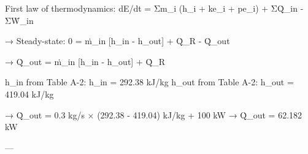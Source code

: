 First law of thermodynamics:  
dE/dt = Σm_i (h_i + ke_i + pe_i) + ΣQ̇_in - ΣẆ_in  

→ Steady-state:  
0 = ṁ_in [h_in - h_out] + Q̇_R - Q̇_out  

→ Q̇_out = ṁ_in [h_in - h_out] + Q̇_R  

h_in from Table A-2: h_in = 292.38 kJ/kg  
h_out from Table A-2: h_out = 419.04 kJ/kg  

→ Q̇_out = 0.3 kg/s × (292.38 - 419.04) kJ/kg + 100 kW  
→ Q̇_out = 62.182 kW  

---